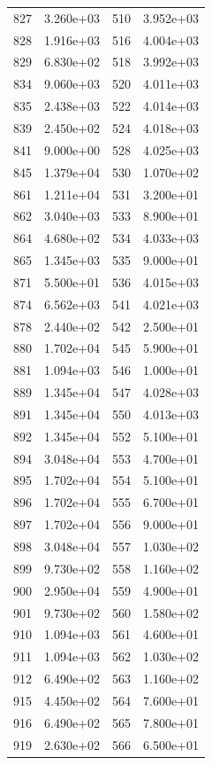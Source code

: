 \documentclass[12pt]{article}
\begin{document}
\begin{longtable}{@{}cccc@{}}
827 & 3.260e+03 & 510 & 3.952e+03 \\
828 & 1.916e+03 & 516 & 4.004e+03 \\
829 & 6.830e+02 & 518 & 3.992e+03 \\
834 & 9.060e+03 & 520 & 4.011e+03 \\
835 & 2.438e+03 & 522 & 4.014e+03 \\
839 & 2.450e+02 & 524 & 4.018e+03 \\
841 & 9.000e+00 & 528 & 4.025e+03 \\
845 & 1.379e+04 & 530 & 1.070e+02 \\
861 & 1.211e+04 & 531 & 3.200e+01 \\
862 & 3.040e+03 & 533 & 8.900e+01 \\
864 & 4.680e+02 & 534 & 4.033e+03 \\
865 & 1.345e+03 & 535 & 9.000e+01 \\
871 & 5.500e+01 & 536 & 4.015e+03 \\
874 & 6.562e+03 & 541 & 4.021e+03 \\
878 & 2.440e+02 & 542 & 2.500e+01 \\
880 & 1.702e+04 & 545 & 5.900e+01 \\
881 & 1.094e+03 & 546 & 1.000e+01 \\
889 & 1.345e+04 & 547 & 4.028e+03 \\
891 & 1.345e+04 & 550 & 4.013e+03 \\
892 & 1.345e+04 & 552 & 5.100e+01 \\
894 & 3.048e+04 & 553 & 4.700e+01 \\
895 & 1.702e+04 & 554 & 5.100e+01 \\
896 & 1.702e+04 & 555 & 6.700e+01 \\
897 & 1.702e+04 & 556 & 9.000e+01 \\
898 & 3.048e+04 & 557 & 1.030e+02 \\
899 & 9.730e+02 & 558 & 1.160e+02 \\
900 & 2.950e+04 & 559 & 4.900e+01 \\
901 & 9.730e+02 & 560 & 1.580e+02 \\
910 & 1.094e+03 & 561 & 4.600e+01 \\
911 & 1.094e+03 & 562 & 1.030e+02 \\
912 & 6.490e+02 & 563 & 1.160e+02 \\
915 & 4.450e+02 & 564 & 7.600e+01 \\
916 & 6.490e+02 & 565 & 7.800e+01 \\
919 & 2.630e+02 & 566 & 6.500e+01 \\

\end{longtable}
\end{document}

